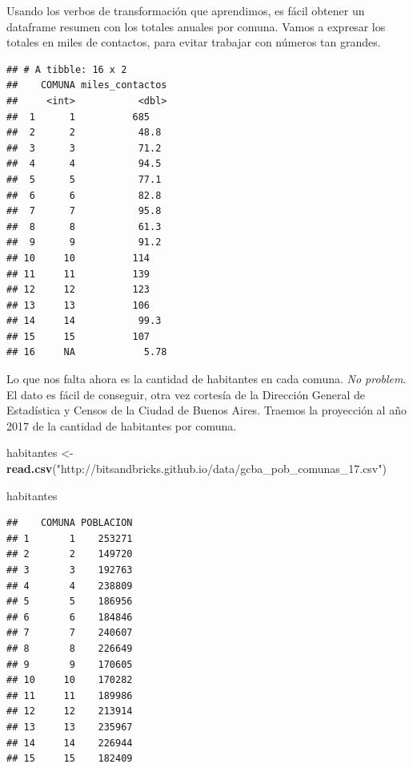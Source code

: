 \documentclass[]{book}
\newenvironment{Shaded}{\begin{snugshade}}{\end{snugshade}}
\newcommand{\KeywordTok}[1]{\textcolor[rgb]{0.13,0.29,0.53}{\textbf{#1}}}
\newcommand{\DataTypeTok}[1]{\textcolor[rgb]{0.13,0.29,0.53}{#1}}
\newcommand{\DecValTok}[1]{\textcolor[rgb]{0.00,0.00,0.81}{#1}}
\newcommand{\StringTok}[1]{\textcolor[rgb]{0.31,0.60,0.02}{#1}}
\newcommand{\OperatorTok}[1]{\textcolor[rgb]{0.81,0.36,0.00}{\textbf{#1}}}
\newcommand{\NormalTok}[1]{#1}
\begin{document}
Usando los verbos de transformación que aprendimos, es fácil obtener un
dataframe resumen con los totales anuales por comuna. Vamos a expresar
los totales en miles de contactos, para evitar trabajar con números tan
grandes.

\begin{Shaded}
\end{Shaded}

\begin{verbatim}
## # A tibble: 16 x 2
##    COMUNA miles_contactos
##     <int>           <dbl>
##  1      1          685   
##  2      2           48.8 
##  3      3           71.2 
##  4      4           94.5 
##  5      5           77.1 
##  6      6           82.8 
##  7      7           95.8 
##  8      8           61.3 
##  9      9           91.2 
## 10     10          114   
## 11     11          139   
## 12     12          123   
## 13     13          106   
## 14     14           99.3 
## 15     15          107   
## 16     NA            5.78
\end{verbatim}

Lo que nos falta ahora es la cantidad de habitantes en cada comuna.
\emph{No problem}. El dato es fácil de conseguir, otra vez cortesía de
la Dirección General de Estadística y Censos de la Ciudad de Buenos
Aires. Traemos la proyección al año 2017 de la cantidad de habitantes
por comuna.

\begin{Shaded}
\begin{Highlighting}[]
\NormalTok{habitantes <-}\StringTok{ }\KeywordTok{read.csv}\NormalTok{(}\StringTok{"http://bitsandbricks.github.io/data/gcba_pob_comunas_17.csv"}\NormalTok{)}

\NormalTok{habitantes}
\end{Highlighting}
\end{Shaded}

\begin{verbatim}
##    COMUNA POBLACION
## 1       1    253271
## 2       2    149720
## 3       3    192763
## 4       4    238809
## 5       5    186956
## 6       6    184846
## 7       7    240607
## 8       8    226649
## 9       9    170605
## 10     10    170282
## 11     11    189986
## 12     12    213914
## 13     13    235967
## 14     14    226944
## 15     15    182409
\end{verbatim}
\end{document}

